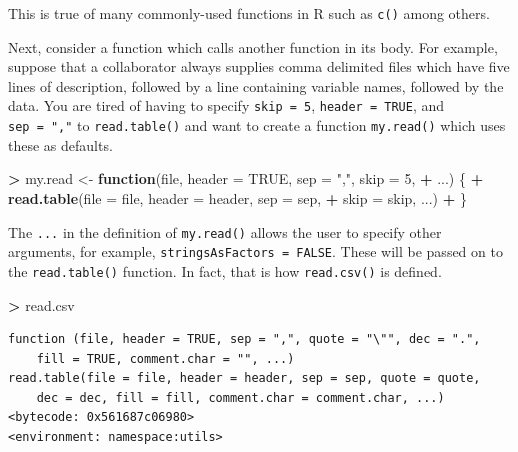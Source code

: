 \documentclass[]{krantz}
\makeatletter
\newenvironment{Shaded}{\begin{snugshade}}{\end{snugshade}}
\newcommand{\KeywordTok}[1]{\textcolor[rgb]{0.27,0.27,0.27}{\textbf{#1}}}
\newcommand{\DataTypeTok}[1]{\textcolor[rgb]{0.27,0.27,0.27}{#1}}
\newcommand{\DecValTok}[1]{\textcolor[rgb]{0.06,0.06,0.06}{#1}}
\newcommand{\StringTok}[1]{\textcolor[rgb]{0.5,0.5,0.5}{#1}}
\newcommand{\OtherTok}[1]{\textcolor[rgb]{0.37,0.37,0.37}{#1}}
\newcommand{\ControlFlowTok}[1]{\textcolor[rgb]{0.27,0.27,0.27}{\textbf{#1}}}
\newcommand{\OperatorTok}[1]{\textcolor[rgb]{0.43,0.43,0.43}{\textbf{#1}}}
\newcommand{\NormalTok}[1]{#1}
\newenvironment{kframe}{%
\medskip{}
\setlength{\fboxsep}{.8em}
 \def\at@end@of@kframe{}%
 \ifinner\ifhmode%
  \def\at@end@of@kframe{\end{minipage}}%
  \begin{minipage}{\columnwidth}%
 \fi\fi%
 \def\FrameCommand##1{\hskip\@totalleftmargin \hskip-\fboxsep
 \colorbox{shadecolor}{##1}\hskip-\fboxsep
     \hskip-\linewidth \hskip-\@totalleftmargin \hskip\columnwidth}%
 \MakeFramed {\advance\hsize-\width
   \@totalleftmargin\z@ \linewidth\hsize
   \@setminipage}}%
 {\par\unskip\endMakeFramed%
 \at@end@of@kframe}
\renewenvironment{Shaded}{\begin{kframe}}{\end{kframe}}
\theoremstyle{definition}
\theoremstyle{definition}
\theoremstyle{definition}
\theoremstyle{remark}
\makeatother
\begin{document}
This is true of many commonly-used functions in R such as \texttt{c()}
among others.

Next, consider a function which calls another function in its body. For
example, suppose that a collaborator always supplies comma delimited
files which have five lines of description, followed by a line
containing variable names, followed by the data. You are tired of having
to specify \texttt{skip\ =\ 5}, \texttt{header\ =\ TRUE}, and
\texttt{sep\ =\ ","} to \texttt{read.table()} and want to create a
function \texttt{my.read()} which uses these as defaults.

\begin{Shaded}
\begin{Highlighting}[]
\OperatorTok{>}\StringTok{ }\NormalTok{my.read <-}\StringTok{ }\ControlFlowTok{function}\NormalTok{(file, }\DataTypeTok{header =} \OtherTok{TRUE}\NormalTok{, }\DataTypeTok{sep =} \StringTok{","}\NormalTok{, }\DataTypeTok{skip =} \DecValTok{5}\NormalTok{, }
\OperatorTok{+}\StringTok{   }\NormalTok{...) \{}
\OperatorTok{+}\StringTok{   }\KeywordTok{read.table}\NormalTok{(}\DataTypeTok{file =}\NormalTok{ file, }\DataTypeTok{header =}\NormalTok{ header, }\DataTypeTok{sep =}\NormalTok{ sep, }
\OperatorTok{+}\StringTok{     }\DataTypeTok{skip =}\NormalTok{ skip, ...)}
\OperatorTok{+}\StringTok{ }\NormalTok{\}}
\end{Highlighting}
\end{Shaded}

The \texttt{...} in the definition of \texttt{my.read()} allows the user
to specify other arguments, for example,
\texttt{stringsAsFactors\ =\ FALSE}. These will be passed on to the
\texttt{read.table()} function. In fact, that is how \texttt{read.csv()}
is defined.

\begin{Shaded}
\begin{Highlighting}[]
\OperatorTok{>}\StringTok{ }\NormalTok{read.csv}
\end{Highlighting}
\end{Shaded}

\begin{verbatim}
function (file, header = TRUE, sep = ",", quote = "\"", dec = ".", 
    fill = TRUE, comment.char = "", ...) 
read.table(file = file, header = header, sep = sep, quote = quote, 
    dec = dec, fill = fill, comment.char = comment.char, ...)
<bytecode: 0x561687c06980>
<environment: namespace:utils>
\end{verbatim}



\backmatter
\printindex
\end{document}
